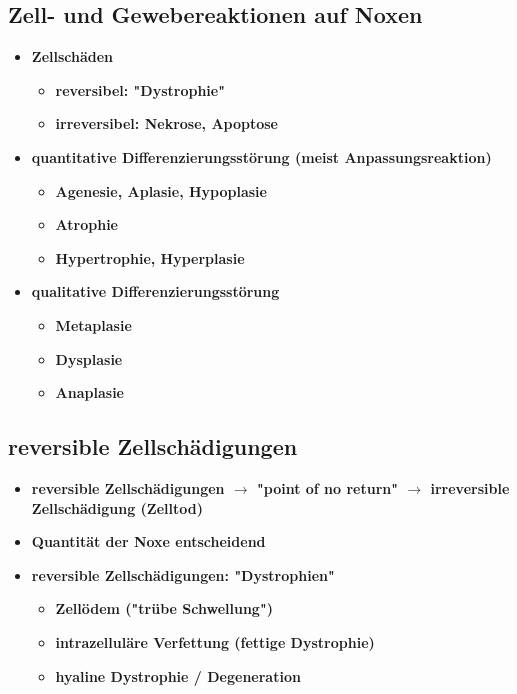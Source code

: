 \subsection{Zell- und Gewebereaktionen auf Noxen}
	\begin{itemize}
		\item \textbf{Zellschäden}
			\begin{itemize}
				\item \textbf{reversibel: "Dystrophie"}
				\item \textbf{irreversibel: Nekrose, Apoptose}
			\end{itemize}
		\item \textbf{quantitative Differenzierungsstörung (meist Anpassungsreaktion)}
			\begin{itemize}
				\item \textbf{Agenesie, Aplasie, Hypoplasie}
				\item \textbf{Atrophie}
				\item \textbf{Hypertrophie, Hyperplasie}
			\end{itemize}
		\item \textbf{qualitative Differenzierungsstörung}
			\begin{itemize}
				\item \textbf{Metaplasie}
				\item \textbf{Dysplasie}
				\item \textbf{Anaplasie}
			\end{itemize}
	\end{itemize}

\subsection{reversible Zellschädigungen}
	\begin{itemize}
		\item \textbf{reversible Zellschädigungen  $\rightarrow$  "point of no return"  $\rightarrow$  irreversible Zellschädigung (Zelltod)}
		\item \textbf{Quantität der Noxe entscheidend}
		\item \textbf{reversible Zellschädigungen: "Dystrophien"}
			\begin{itemize}
				\item \textbf{Zellödem ("trübe Schwellung")}
				\item \textbf{intrazelluläre Verfettung (fettige Dystrophie)}
				\item \textbf{hyaline Dystrophie / Degeneration}
			\end{itemize}
	\end{itemize}

